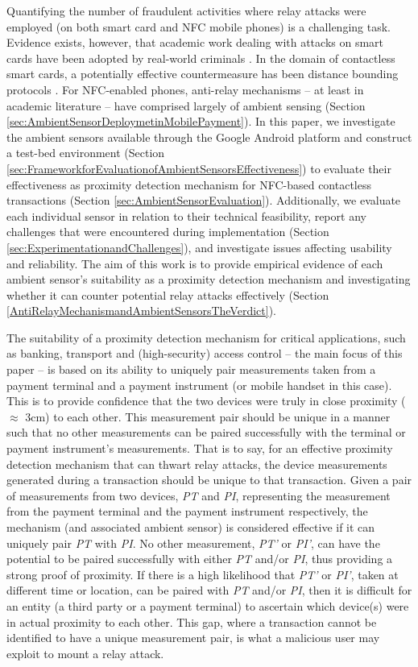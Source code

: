 \documentclass{article}
\begin{document}
Quantifying the number of fraudulent activities where relay attacks were employed (on both smart card and NFC mobile phones) is a challenging task. Evidence exists, however, that academic work dealing with attacks on smart cards have been adopted by real-world criminals \cite{Ferradi2015}.  In the domain of contactless smart cards, a potentially effective countermeasure has been distance bounding protocols \cite{Hancke:2005:RDB:1128018.1128472,trujillo2010poulidor}.  For NFC-enabled phones, anti-relay mechanisms -- at least in academic literature -- have comprised largely of ambient sensing (Section \ref{sec:AmbientSensorDeploymetinMobilePayment}). In this paper, we investigate the ambient sensors available through the Google Android platform and construct a test-bed environment (Section \ref{sec:FrameworkforEvaluationofAmbientSensorsEffectiveness}) to evaluate their effectiveness as proximity detection mechanism for NFC-based contactless transactions (Section \ref{sec:AmbientSensorEvaluation}).  Additionally, we evaluate each individual sensor in relation to their technical feasibility, report any challenges that were encountered during implementation (Section \ref{sec:ExperimentationandChallenges}), and investigate issues affecting usability and reliability.  The aim of this work is to provide empirical evidence of each ambient sensor's suitability as a proximity detection mechanism and investigating whether it can counter potential relay attacks effectively (Section \ref{AntiRelayMechanismandAmbientSensorsTheVerdict}).

The suitability of a proximity detection mechanism for critical applications, such as banking, transport and (high-security) access control -- the main focus of this paper -- is based on its ability to uniquely pair measurements taken from a payment terminal and a payment instrument (or mobile handset in this case).  This is to provide confidence that the two devices were truly in close proximity ($\approx$ 3cm) to each other.  This measurement pair should be unique in a manner such that no other measurements can be paired successfully with the terminal or payment instrument's measurements.  That is to say, for an effective proximity detection mechanism that can thwart relay attacks, the device measurements generated during a transaction should be unique to that transaction.  Given a pair of measurements from two devices, \emph{PT} and \emph{PI}, representing the measurement from the payment terminal and the payment instrument respectively, the mechanism (and associated ambient sensor) is considered effective if it can uniquely pair \emph{PT} with \emph{PI}. No other measurement, \emph{PT'} or \emph{PI'}, can have the potential to be paired successfully with either \emph{PT} and/or \emph{PI}, thus providing a strong proof of proximity.  If there is a high likelihood that \emph{PT'} or \emph{PI'}, taken at different time or location, can be paired with \emph{PT} and/or \emph{PI}, then it is difficult for an entity (a third party or a payment terminal) to ascertain which device(s) were in actual proximity to each other.  This gap, where a transaction cannot be identified to have a unique measurement pair, is what a malicious user may exploit to mount a relay attack.   
\end{document}
